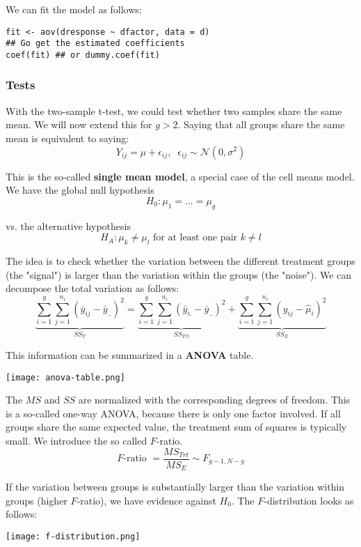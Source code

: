 We can fit the model as follows:
\begin{lstlisting}
fit <- aov(dresponse ~ dfactor, data = d)
## Go get the estimated coefficients
coef(fit) ## or dummy.coef(fit)
\end{lstlisting}

\subsubsection{Tests}

With the two-sample t-test, we could test whether two samples share the same mean. We will now extend this for $g > 2$. Saying that all groups share the same mean is equivalent to saying:
$$Y_{ij} = \mu + \epsilon_{ij}, \; \; \epsilon_{ij} \sim \mathcal N(0, \sigma^2)$$

This is the so-called \textbf{single mean model}, a special case of the cell means model. We have the global null hypothesis
$$H_0 : \mu_1 = ... = \mu_g$$

vs. the alternative hypothesis
$$H_A : \mu_k \neq \mu_l \text{ for at least one pair } k \neq l$$

The idea is to check whether the variation between the different treatment groups (the "signal") is  larger than the variation within the groups (the "noise"). We can decompose the total variation as follows:
$$\underbrace{\sum_{i=1}^g \sum_{j=1}^{n_i}(\bar y_{ij} - \bar y_{..})^2}_{SS_T} = \underbrace{\sum_{i=1}^g \sum_{j=1}^{n_i}(\bar y_{i.} - \bar y_{..})^2}_{SS_{Trt}} + \underbrace{\sum_{i=1}^g \sum_{j=1}^{n_i}(y_{ij} - \hat \mu_i)^2}_{SS_E} $$

This information can be summarized in a \textbf{ANOVA} table.
\begin{center}
	\texttt{[image: anova-table.png]}
\end{center}

The $MS$ and $SS$ are normalized with the corresponding degrees of freedom. This is a so-called one-way ANOVA, because there is only one factor involved. If all groups share the same expected value, the treatment sum of squares is typically small. We introduce the so called $F$-ratio.
$$F\text{-ratio } = \frac{MS_{Trt}}{MS_E} \sim F_{g-1, N-g}$$

If the variation between groups is substantially larger than the variation within groups (higher $F$-ratio), we have evidence against $H_0$. The $F$-distribution looks as follows:
\begin{center}
	\texttt{[image: f-distribution.png]}
\end{center}

